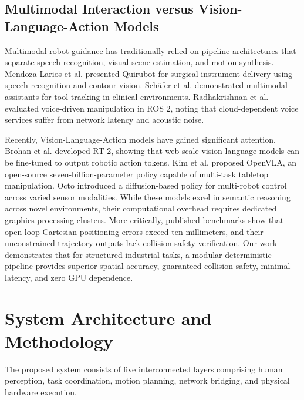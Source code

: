 \documentclass{svproc}
\begin{document}
\subsection{Multimodal Interaction versus Vision-Language-Action Models}
Multimodal robot guidance has traditionally relied on pipeline architectures that separate speech recognition, visual scene estimation, and motion synthesis. Mendoza-Larios et al. \cite{quirubot2016} presented Quirubot for surgical instrument delivery using speech recognition and contour vision. Schäfer et al. \cite{schafer2023smart} demonstrated multimodal assistants for tool tracking in clinical environments. Radhakrishnan et al. \cite{voice_ros2_2024} evaluated voice-driven manipulation in ROS 2, noting that cloud-dependent voice services suffer from network latency and acoustic noise.

Recently, Vision-Language-Action models have gained significant attention. Brohan et al. \cite{rt2_2023} developed RT-2, showing that web-scale vision-language models can be fine-tuned to output robotic action tokens. Kim et al. \cite{openvla2024} proposed OpenVLA, an open-source seven-billion-parameter policy capable of multi-task tabletop manipulation. Octo \cite{octo2024} introduced a diffusion-based policy for multi-robot control across varied sensor modalities. While these models excel in semantic reasoning across novel environments, their computational overhead requires dedicated graphics processing clusters. More critically, published benchmarks show that open-loop Cartesian positioning errors exceed ten millimeters, and their unconstrained trajectory outputs lack collision safety verification. Our work demonstrates that for structured industrial tasks, a modular deterministic pipeline provides superior spatial accuracy, guaranteed collision safety, minimal latency, and zero GPU dependence.

\section{System Architecture and Methodology}
\label{sec:methodology}

The proposed system consists of five interconnected layers comprising human perception, task coordination, motion planning, network bridging, and physical hardware execution.
\end{document}
